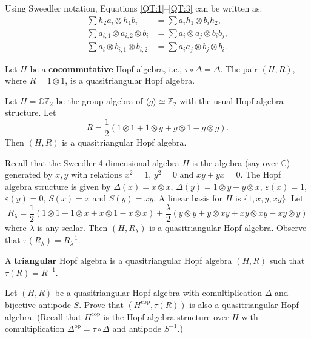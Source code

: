 \begin{remark}
Using Sweedler notation, Equations \eqref{QT:1}--\eqref{QT:3} can
be written as:
\begin{align*}
\sum h_{2}a_{i}\otimes h_{1}b_{i} & =\sum a_{i}h_{1}\otimes b_{i}h_{2},\\
\sum a_{i,1}\otimes a_{i,2}\otimes b_{i} & =\sum a_{i}\otimes a_{j}\otimes b_{i}b_{j},\\
\sum a_{i}\otimes b_{i,1}\otimes b_{i,2} & =\sum a_{i}a_{j}\otimes b_{j}\otimes b_{i}.
\end{align*}
\end{remark}

\begin{example}
Let $H$ be a \textbf{cocommutative} Hopf algebra, i.e.,
$\tau\circ\Delta=\Delta$.  The pair $(H,R)$, where $R=1\otimes1$, is a
quasitriangular Hopf algebra.
\end{example}

\begin{example}
Let $H=\mathbb{C}\mathbb{Z}_{2}$ be the group algebra of $\langle
g\rangle\simeq\mathbb{Z}_{2}$ with the usual Hopf algebra structure. Let 
\[
R=\frac{1}{2}(1\otimes1+1\otimes g+g\otimes1-g\otimes g).
\]
Then $(H,R)$ is a quasitriangular Hopf algebra.
\end{example}

\begin{example}
Recall that the Sweedler 4-dimensional algebra $H$ is the algebra (say over
$\mathbb{C}$) generated by $x,y$ with relations $x^{2}=1$, $y^{2}=0$ and
$xy+yx=0$.  The Hopf algebra structure is given by $\Delta(x)=x\otimes x$,
$\Delta(y)=1\otimes y+y\otimes x$, $\varepsilon(x)=1$, $\varepsilon(y)=0$,
$S(x)=x$ and $S(y)=xy$.  A linear basis for $H$ is $\{1,x,y,xy\}$. Let
\[
R_{\lambda}=\frac{1}{2}(1\otimes1+1\otimes x+x\otimes1-x\otimes x)+\frac{\lambda}{2}(y\otimes y+y\otimes xy+xy\otimes xy-xy\otimes y)
\]
where $\lambda$ is any scalar. Then $(H,R_{\lambda})$ is a quasitriangular
Hopf algebra. Observe that $\tau(R_{\lambda})=R_{\lambda}^{-1}$.
\end{example}

\begin{definition}
A \textbf{triangular} Hopf algebra is a quasitriangular Hopf algebra
$(H,R)$ such that $\tau(R)=R^{-1}$. 
\end{definition}

\begin{exercise}
Let $(H,R)$ be a quasitriangular Hopf algebra with comultiplication $\Delta$
and bijective antipode $S$. Prove that $(H^{\mathrm{cop}},\tau(R))$ is also a
quasitriangular Hopf algebra. (Recall that $H^{\mathrm{cop}}$ is the Hopf
algebra structure over $H$ with comultiplication
$\Delta^{\mathrm{op}}=\tau\circ\Delta$ and antipode $S^{-1}$.)
\end{exercise}

